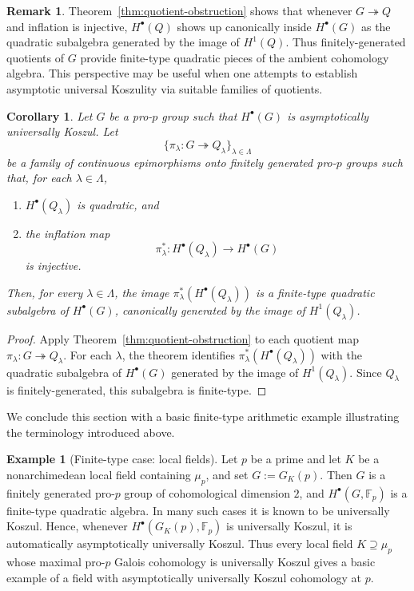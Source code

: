\documentclass[11pt]{amsart}
\numberwithin{equation}{section}
\newtheorem{corollary}[theorem]{Corollary}
\theoremstyle{definition}
\newtheorem{example}[theorem]{Example}
\newtheorem{remark}[theorem]{Remark}
\begin{document}
	
	
	
	\begin{remark}
		Theorem~\ref{thm:quotient-obstruction} shows that whenever  $G \twoheadrightarrow Q$ and inflation is injective, $H^\bullet(Q)$ shows up canonically inside $H^\bullet(G)$ as the quadratic subalgebra generated by the image of $H^1(Q)$. Thus finitely-generated quotients of $G$ provide finite-type quadratic pieces of the ambient cohomology algebra. This perspective may be useful when one attempts to establish asymptotic universal Koszulity via suitable families of quotients.
	\end{remark}
	
	
	\begin{corollary}
		Let \(G\) be a pro-\(p\) group such that \(H^\bullet(G)\) is asymptotically universally Koszul. Let
		\[\{\pi_\lambda \colon G \twoheadrightarrow Q_\lambda\}_{\lambda\in\Lambda}\]
		be a family of continuous epimorphisms onto finitely generated pro-\(p\) groups such that, for each \(\lambda\in\Lambda\),
		\begin{enumerate}
			\item[\textrm{(i)}] \(H^\bullet(Q_\lambda)\) is quadratic, and
			\item[\textrm{(ii)}] the inflation map
			\[\pi_\lambda^* \colon H^\bullet(Q_\lambda)\longrightarrow H^\bullet(G)\]
			is injective.
		\end{enumerate}
		Then, for every \(\lambda\in\Lambda\), the image \(\pi_\lambda^*(H^\bullet(Q_\lambda))\) is a finite-type quadratic subalgebra of \(H^\bullet(G)\), canonically generated by the image of \(H^1(Q_\lambda)\).
	\end{corollary}
	
	\begin{proof}
		Apply Theorem~\ref{thm:quotient-obstruction} to each quotient map $\pi_\lambda \colon G\twoheadrightarrow Q_\lambda$. For each \(\lambda\), the theorem identifies $	\pi_\lambda^*(H^\bullet(Q_\lambda))$ with the quadratic subalgebra of \(H^\bullet(G)\) generated by the image of \(H^1(Q_\lambda)\). Since \(Q_\lambda\) is finitely-generated, this subalgebra is finite-type.
	\end{proof}
	
	
	We conclude this section with a basic finite-type arithmetic example illustrating the terminology introduced above.
	
	\begin{example}[Finite-type case: local fields]
		Let \(p\) be a prime and let \(K\) be a nonarchimedean local field containing \(\mu_p\), and set $	G:=G_K(p)$. Then \(G\) is a finitely generated pro-\(p\) group of cohomological dimension \(2\), and \(H^\bullet(G,\mathbb{F}_p)\) is a finite-type quadratic algebra. In many such cases it is known to be universally Koszul. Hence, whenever \(H^\bullet(G_K(p),\mathbb{F}_p)\) is universally Koszul, it is automatically asymptotically universally Koszul. Thus every local field \(K\supseteq \mu_p\) whose maximal pro-\(p\) Galois cohomology is universally Koszul gives a basic example of a field with asymptotically universally Koszul cohomology at \(p\).
	\end{example}
	
\end{document}
